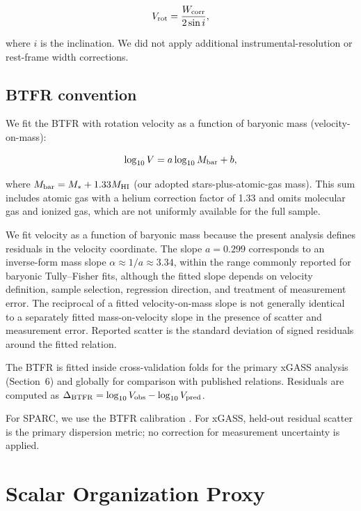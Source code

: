 \documentclass[11pt]{article}
\begin{document}
\begin{equation}
V_{\rm rot} = \frac{W_{\rm corr}}{2\sin i},\label{eq:vrot}
\end{equation}

where $i$ is the inclination. We did not apply additional instrumental-resolution or rest-frame width corrections.

\subsection{BTFR convention}

We fit the BTFR with rotation velocity as a function of baryonic mass (velocity-on-mass):

\begin{equation}
\log_{10} V = a \log_{10} M_{\rm bar} + b,
\end{equation}

where $M_{\rm bar} = M_* + 1.33 M_{\rm HI}$ (our adopted stars-plus-atomic-gas mass). This sum includes atomic gas with a helium correction factor of 1.33 and omits molecular gas and ionized gas, which are not uniformly available for the full sample.

We fit velocity as a function of baryonic mass because the present analysis defines residuals in the velocity coordinate. The slope $a=0.299$ corresponds to an inverse-form mass slope $\alpha \approx 1/a \approx 3.34$, within the range commonly reported for baryonic Tully--Fisher fits, although the fitted slope depends on velocity definition, sample selection, regression direction, and treatment of measurement error. The reciprocal of a fitted velocity-on-mass slope is not generally identical to a separately fitted mass-on-velocity slope in the presence of scatter and measurement error. Reported scatter is the standard deviation of signed residuals around the fitted relation.

The BTFR is fitted inside cross-validation folds for the primary xGASS analysis (Section~6) and globally for comparison with published relations. Residuals are computed as $\Delta_{\rm BTFR} = \log_{10} V_{\rm obs} - \log_{10} V_{\rm pred}$.

For SPARC, we use the BTFR calibration \cite{mcGaugh2012}.
For xGASS, held-out residual scatter is the primary dispersion metric; no correction for measurement uncertainty is applied.

\section{Scalar Organization Proxy}
\end{document}
